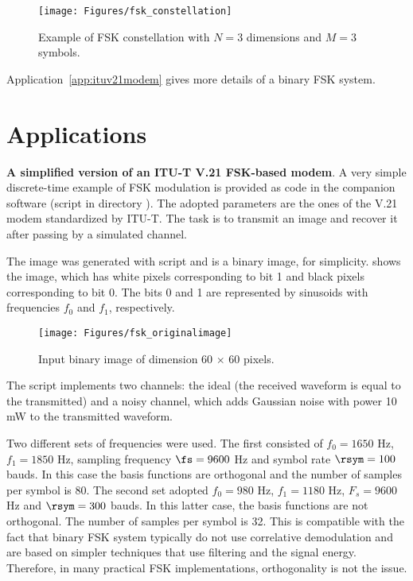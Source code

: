 \begin{figure}[htbp]
	\centering
		\texttt{[image: Figures/fsk\_constellation]}		
	\caption{Example of FSK constellation with $N=3$ dimensions and $M=3$ symbols.\label{fig:fsk_constellation}}
\end{figure}
Application~\ref{app:ituv21modem} gives more details of a binary FSK system.

\section{Applications}

\bApplication
\textbf{A simplified version of an ITU-T V.21 FSK-based modem}.
\label{app:ituv21modem}
A very simple discrete-time example of FSK modulation is provided as {\matlab} code in the companion software (script  in directory ). The adopted parameters are the ones of the V.21 modem standardized by ITU-T. The task is to transmit an image and recover it after passing by a simulated channel.

The image was generated with script  and is a binary image, for simplicity.  shows the image, which has white pixels corresponding to bit 1 and black pixels corresponding to bit 0. The bits 0 and 1 are represented by sinusoids with frequencies $f_0$ and $f_1$, respectively.

\begin{figure}[htbp]
	\centering
		\texttt{[image: Figures/fsk\_originalimage]}		
	\caption{Input binary image of dimension 60 $\times$ 60 pixels.\label{fig:fsk_originalimage}}
\end{figure}

The script implements two channels: the ideal (the received waveform is equal to the transmitted) and a noisy channel, which adds Gaussian noise with power 10 mW to the transmitted waveform.

Two different sets of frequencies were used. The first consisted of $f_0=1650$ Hz, $f_1=1850$ Hz, sampling frequency $\fs = 9600$ Hz and symbol rate $\rsym = 100$ bauds. In this case the basis functions are orthogonal and the number of samples per symbol is 80.
The second set adopted $f_0=980$ Hz, $f_1=1180$ Hz, $F_s = 9600$ Hz and $\rsym = 300$ bauds. In this latter case, the basis functions are not orthogonal. The number of samples per symbol is 32. This is compatible with the fact that binary FSK system typically do not use correlative demodulation and are based on simpler techniques that use filtering and the signal energy. Therefore, in many practical FSK implementations, orthogonality is not the issue.

